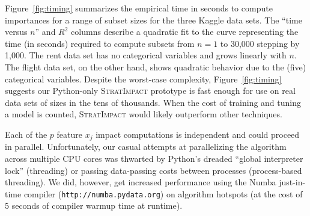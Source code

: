 \documentclass[11pt]{article}
\newcommand{\figref}[1]{Figure~\ref{#1}}
\newcommand{\simp}{\fontfamily{cmr}\textsc{\small StratImpact}}
\begin{document}
\figref{fig:timing} summarizes the empirical time in seconds to compute importances for a range of subset sizes for the three Kaggle data sets. The ``time versus $n$'' and $R^2$ columns describe a quadratic fit to the curve representing the time (in seconds) required to compute subsets from $n=1$ to 30,000 stepping by 1,000. The rent data set has no categorical variables and grows linearly with $n$. The flight data set, on the other hand, shows quadratic behavior due to the (five) categorical variables. Despite the worst-case complexity, \figref{fig:timing} suggests our Python-only \simp{} prototype is fast enough for use on real data sets of sizes in the tens of thousands. When the cost of training and tuning a model is counted, \simp{} would likely outperform other techniques.

Each of the $p$ feature $x_j$ impact computations is independent and could proceed in parallel. Unfortunately, our casual attempts at parallelizing the algorithm across multiple CPU cores was thwarted by Python's dreaded ``global interpreter lock'' (threading) or passing data-passing costs between processes (process-based threading).  We did, however, get increased performance using the Numba just-in-time compiler ({\tt\small http://numba.pydata.org}) on algorithm hotspots (at the cost of 5 seconds of compiler warmup time at runtime).
\end{document}
